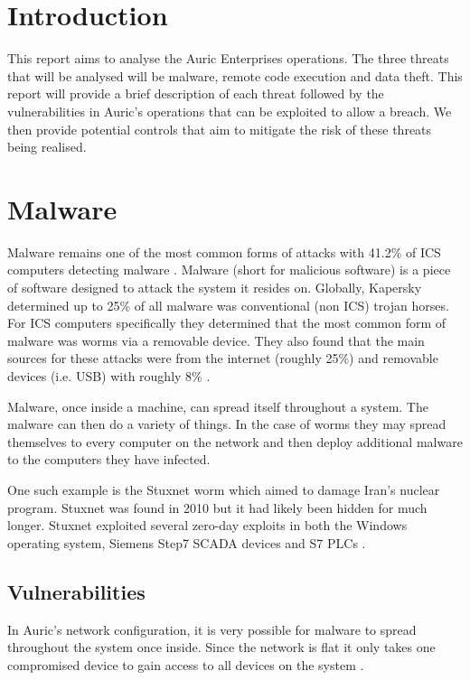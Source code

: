 \documentclass{article}
\begin{document}
\begin{multicols}{2}
    \section{Introduction}
    This report aims to analyse the Auric Enterprises operations.
    The three threats that will be analysed will be malware, 
    remote code execution and data theft. This report will provide a brief
    description of each threat followed by the vulnerabilities in Auric's operations
    that can be exploited to allow a breach. We then provide potential
    controls that aim to mitigate the risk of these threats being
    realised.

    \section{Malware}
    Malware remains one of the most common forms of attacks with 41.2\% of ICS
    computers detecting malware \cite{kapersky}.
    Malware (short for malicious software) is a piece of software designed to attack
    the system it resides on. 
    Globally,
    Kapersky determined up to 25\% of all malware was conventional (non ICS) trojan
    horses.
    For ICS computers specifically they determined that the most common form of
    malware was worms via a removable device.
    They also found that the main sources for these attacks were from
    the internet (roughly 25\%) and removable devices (i.e. USB) with roughly 8\%
    \cite{kapersky}.

    Malware, once inside a machine,
    can spread itself throughout a system. The malware can then
    do a variety of things. 
    In the case of worms they may spread themselves to every
    computer on the network and then deploy additional malware to the computers
    they have infected.
    
    One such example is the Stuxnet worm which aimed to damage Iran's nuclear
    program. Stuxnet was found in 2010 but it had likely been hidden for much
    longer. Stuxnet exploited several zero-day 
    exploits in both the Windows operating
    system, Siemens Step7 SCADA devices and S7 PLCs \cite{stuxnet}.

    \subsection{Vulnerabilities}
    In Auric's network configuration, it is very possible for malware to spread
    throughout the system once inside.
    Since the network is flat it only takes one compromised device to gain access to
    all devices on the system \cite{forbes}.


\end{multicols}
\end{document}
